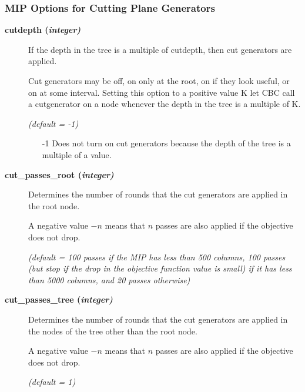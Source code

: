 \subsubsection{MIP Options for Cutting Plane Generators}

\begin{description}


\item[\label{cutdepth}\hypertarget{cutdepth}
{\textbf{cutdepth (\slshape{integer})}}]\hspace{1.0in}

If the depth in the tree is a multiple of cutdepth, then cut generators are applied.

Cut generators may be off, on only at the root, on if they look useful, or on at some interval.
Setting this option to a positive value K let CBC call a cutgenerator on a node whenever the depth in the tree is a multiple of K.

\textsl{(default = -1)}
\begin{itemize}
\item[-1]
Does not turn on cut generators because the depth of the tree is a multiple of a value.
\end{itemize}

\item[\label{cut_passes_root}\hypertarget{cut_passes_root}
{\textbf{cut\_passes\_root (\slshape{integer})}}]\hspace{1.0in}

Determines the number of rounds that the cut generators are applied in the root node.

A negative value $-n$ means that $n$ passes are also applied if the objective does not drop.

\textsl{(default = 100 passes if the MIP has less than 500 columns, 100 passes (but stop if the drop in the objective function value is small) if it has less than 5000 columns, and 20 passes otherwise)}


\item[\label{cut_passes_tree}\hypertarget{cut_passes_tree}
{\textbf{cut\_passes\_tree (\slshape{integer})}}]\hspace{1.0in}

Determines the number of rounds that the cut generators are applied in the nodes of the tree other than the root node.

A negative value $-n$ means that $n$ passes are also applied if the objective does not drop.

\textsl{(default = 1)}


\end{description}

